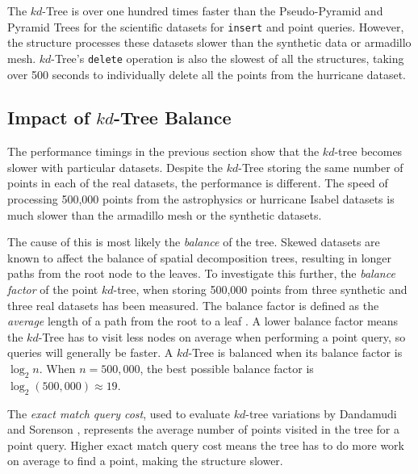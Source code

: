 The $kd$-Tree is over one hundred times faster than the Pseudo-Pyramid and Pyramid Trees for the scientific datasets for \texttt{insert} and point queries. However, the structure processes these datasets slower than the synthetic data or armadillo mesh. $kd$-Tree's \texttt{delete} operation is also the slowest of all the structures, taking over 500 seconds to individually delete all the points from the hurricane dataset.

\subsection{Impact of $kd$-Tree Balance}

The performance timings in the previous section show that the $kd$-tree becomes slower with particular datasets. Despite the $kd$-Tree storing the same number of points in each of the real datasets, the performance is different. The speed of processing 500,000 points from the astrophysics or hurricane Isabel datasets is much slower than the armadillo mesh or the synthetic datasets. 

The cause of this is most likely the \textit{balance} of the tree. Skewed datasets are known to affect the balance of spatial decomposition trees, resulting in longer paths from the root node to the leaves. To investigate this further, the \textit{balance factor} of the point $kd$-tree, when storing 500,000 points from three synthetic and three real datasets has been measured. The balance factor is defined as the \textit{average} length of a path from the root to a leaf \cite{kdtree-v-bdtree}. A lower balance factor means the $kd$-Tree has to visit less nodes on average when performing a point query, so queries will generally be faster. A $kd$-Tree is balanced when its balance factor is $\log_2 n$. When $n = 500,000$, the best possible balance factor is $\log_2 (500,000) \approx 19$.

The \textit{exact match query cost}, used to evaluate $kd$-tree variations by Dandamudi and Sorenson \cite{kdtree-v-bdtree}, represents the average number of points visited in the tree for a point query. Higher exact match query cost means the tree has to do more work on average to find a point, making the structure slower.

